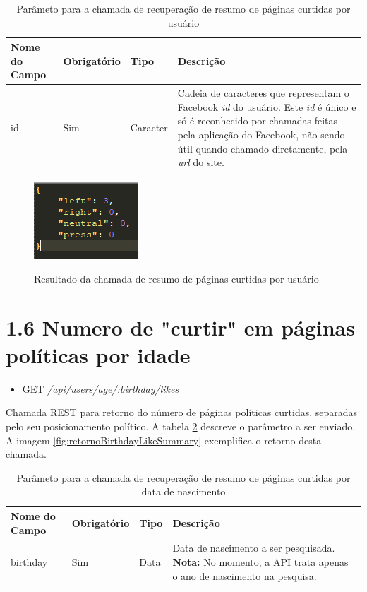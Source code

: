 \documentclass[
	12pt,				%
	oneside,			%
	a4paper,			%
	english,			%
	brazil				%
	]{abntex2ppgsi}
\begin{document}
\begin{apendicesenv}
 \begin{table}[htbp]
	\centering
	\caption{Parâmeto para a chamada de recuperação de resumo de páginas curtidas por usuário}
	\begin{tabular}{p{1.5in} p{1in} p{1in} p{1.5in}  } \hline
		Nome do Campo 		& 		Obrigatório 		& 		Tipo 		&		 Descrição \\ \hline
		id				& 		Sim					& Caracter 		&
		Cadeia de caracteres que representam o Facebook \textit{id} do usuário. Este \textit{id} é único e só é reconhecido por chamadas feitas pela aplicação do Facebook, não sendo útil quando chamado diretamente, pela \textit{url} do site.
	\end{tabular}
	\label{tab:tabelaUserLikeSummary}
\end{table}

\begin{figure}[H]
	\centering
	\caption{Resultado da chamada de resumo de páginas curtidas por usuário}
	\includegraphics[scale=1]{resultadoUserLikeSummary.png}
	\label{fig:retornoUserLikeSummary}
\end{figure}

\section*{1.6 Numero de "curtir" em páginas políticas por idade}

\begin{itemize}
	\item {GET} \textit{/api/users/age/:birthday/likes}
\end{itemize}

Chamada REST para retorno do número de páginas políticas curtidas, separadas pelo seu posicionamento político. A tabela \ref{tab:tabelaBirthdayLikeSummary} descreve o parâmetro a ser enviado. A imagem \ref{fig:retornoBirthdayLikeSummary} exemplifica o retorno desta chamada.

 \begin{table}[htbp]
	\centering
	\caption{Parâmeto para a chamada de recuperação de resumo de páginas curtidas por data de nascimento}
	\begin{tabular}{p{1.5in} p{1in} p{1in} p{1.5in}  } \hline
		Nome do Campo 		& 		Obrigatório 		& 		Tipo 		&		 Descrição \\ \hline
		birthday				& 		Sim					& Data 		&
		Data de nascimento a ser pesquisada. \textbf{Nota: } No momento, a API trata apenas o ano de nascimento na pesquisa.
	\end{tabular}
	\label{tab:tabelaBirthdayLikeSummary}
\end{table}


\end{apendicesenv}
\end{document}
